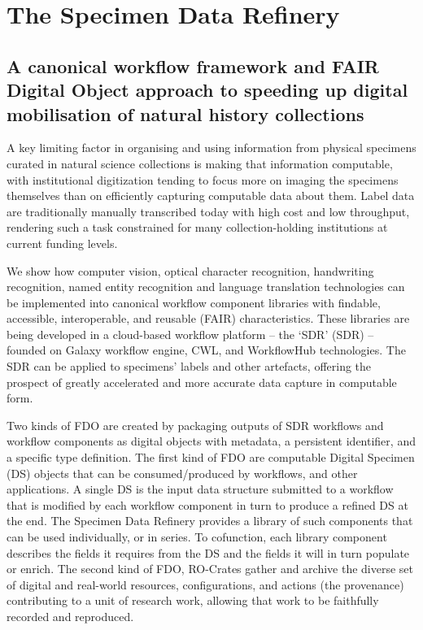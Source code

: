 \section{The Specimen Data Refinery}
\label{ch8:the-specimen-data-refinery}

\subsection*{A canonical workflow framework and FAIR Digital Object
approach to speeding up digital mobilisation of natural history
collections}

A key limiting factor in organising and using information from physical
specimens curated in natural science collections is making that
information computable, with institutional digitization tending to focus
more on imaging the specimens themselves than on efficiently capturing
computable data about them. Label data are traditionally manually
transcribed today with high cost and low throughput, rendering such a
task constrained for many collection-holding institutions at current
funding levels.

We show how computer vision, optical character recognition, handwriting
recognition, named entity recognition and language translation
technologies can be implemented into canonical workflow component
libraries with findable, accessible, interoperable, and reusable (\acrshort{FAIR})
characteristics. These libraries are being developed in a cloud-based
workflow platform -- the `\acrlong{SDR}' (SDR) -- founded on
Galaxy workflow engine, 
\acrlong{CWL},
and WorkflowHub technologies. The SDR can be applied to
specimens' labels and other artefacts, offering the prospect of greatly
accelerated and more accurate data capture in computable form.

Two kinds of 
\acrfull{FDO}
are created by packaging outputs
of SDR workflows and workflow components as digital objects with
metadata, a persistent identifier, and a specific type definition. The
first kind of FDO are computable Digital Specimen (DS) objects that can
be consumed/produced by workflows, and other applications. A single DS
is the input data structure submitted to a workflow that is modified by
each workflow component in turn to produce a refined DS at the end. The
Specimen Data Refinery provides a library of such components that can be
used individually, or in series. To cofunction, each library component
describes the fields it requires from the DS and the fields it will in
turn populate or enrich. The second kind of FDO, RO-Crates gather and
archive the diverse set of digital and real-world resources,
configurations, and actions (the provenance) contributing to a unit of
research work, allowing that work to be faithfully recorded and
reproduced.

